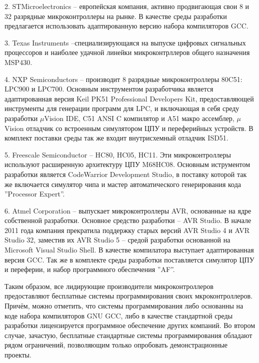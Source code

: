 \begin{par}
	2. STMicroelectronics -- европейская компания, активно продвигающая свои 8 и 32
		разрядные микроконтроллеры на рынке. В качестве среды разработки предлагается
		использовать адаптированную версию набора компиляторов GCC.
\end{par}

\begin{par}
	3. Texas Instruments --специализирующаяся на выпуске цифровых сигнальных процессоров
		и наиболее удачной линейки микроконтрллеров общего назначения MSP430.
\end{par}

\begin{par}
	4. NXP Semiconductors -- производит 8 разрядные микроконтроллеры
			80C51: LPC900 и LPC700.
			Основным инструментом разработчика является адаптированная версия
			Keil PK51 Professional Developers Kit, предоставляющей инструменты для
			генерации программ для LPC, и включающая в себя среду разработки
			$\mu{}$Vision IDE, C51 ANSI C компилятор и A51 макро ассемблер, $\mu{}$Vision отладчик
			со встроенным симулятором ЦПУ и переферийных устройств. В комплект поставки
			среды так же входит внутрисхемный отладчик ISD51.
\end{par}

\begin{par}
	5. Freescale Semiconductor -- HC80, HC05, HC11.
	Эти микроконтроллеры используют расширенную архитектуру ЦПУ M68HC08.
	Основным иструментом разработки является CodeWarrior Development Studio, в поставку
	которой так же включается симулятор чипа и мастер автоматического генерирования
	кода ''Processor Expert''.
\end{par}


\begin{par}
	6. Atmel Corporation -- выпускает микроконтроллеры AVR, основанные на ядре
	собственной разработки. Основное средство разработки -- AVR Studio. В начале 2011
	года компания прекратила поддержку старых версий AVR Studio 4 и AVR Studio 32,
	заместив их AVR Studio 5 -- средой разработки основанной на Microsoft Visual
	Studio Shell. В качестве компилатора выступает адаптированная версия GCC. Так
	же в комплекте среды разработки поставляется симулятор ЦПУ и переферии, и
	набор программного обеспечения ''AF''.
\end{par}

Таким образом, все лидирующие производители микроконтроллеров предоставляют
бесплатные системы программирования своих мкроконтроллеров.
Причём, можно отметить, что системы программирования либо основанны на коде 
набора компиляторов GNU GCC, либо в качестве стандартной среды разработки лицензируется
программное обеспечение других компаний. Во втором случае, зачастую, бесплатные
стандартные системы программирования обладают рядом ограничений, позволяющим только
опробовать демонстрационные проекты.

